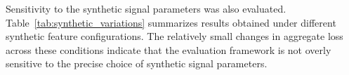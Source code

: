 \appendix


Sensitivity to the synthetic signal parameters was also evaluated. Table~\ref{tab:synthetic_variations} summarizes results obtained under different synthetic feature configurations. The relatively small changes in aggregate loss across these conditions indicate that the evaluation framework is not overly sensitive to the precise choice of synthetic signal parameters.



